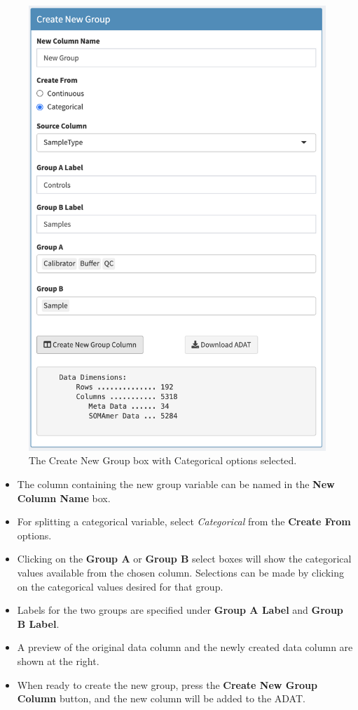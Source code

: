 \documentclass[
]{book}
\providecommand{\tightlist}{%
  \setlength{\itemsep}{0pt}\setlength{\parskip}{0pt}}
\begin{document}
\begin{figure}
\centering
\includegraphics{images/CreateGroup_Categorical.png}
\caption{The Create New Group box with Categorical options selected.}
\end{figure}

\begin{itemize}
\tightlist
\item
  The column containing the new group variable can be named in the \textbf{New Column Name} box.\\
\item
  For splitting a categorical variable, select \emph{Categorical} from the \textbf{Create From} options.\\
\item
  Clicking on the \textbf{Group A} or \textbf{Group B} select boxes will show the categorical values available from the chosen column. Selections can be made by clicking on the categorical values desired for that group.
\item
  Labels for the two groups are specified under \textbf{Group A Label} and \textbf{Group B Label}.
\item
  A preview of the original data column and the newly created data column are shown at the right.
\item
  When ready to create the new group, press the \textbf{Create New Group Column} button, and the new column will be added to the ADAT.
\end{itemize}
\end{document}
